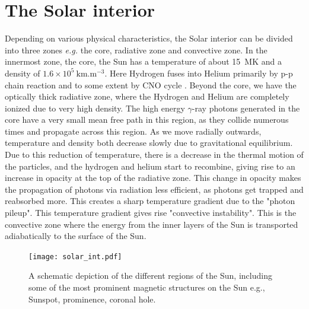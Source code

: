 \section{The Solar interior}\label{solar_int} 
Depending on various physical characteristics, the Solar interior can be divided into three zones {\it e.g.} the core, radiative zone and convective zone. In the innermost zone, the core, the Sun has a temperature of about 15~MK and a density of $\mathrm{1.6\times 10^{5}~km.m^{-3}}$. Here Hydrogen fuses into Helium primarily by p-p chain reaction \citep{bethe38} and to some extent by CNO cycle \citep{bethe39}. Beyond the core, we have the optically thick radiative zone, where the Hydrogen and Helium are completely ionized due to very high density. The high energy $\gamma$-ray photons generated in the core have a very small mean free path in this region, as they collide numerous times and propagate across this region. As we move radially outwards, temperature and density both decrease slowly due to gravitational equilibrium. Due to this reduction of temperature, there is a decrease in the thermal motion of the particles, and the hydrogen and helium start to recombine, giving rise to an increase in opacity at the top of the radiative zone. This change in opacity makes the propagation of photons via radiation less efficient, as photons get trapped and reabsorbed more. This creates a sharp temperature gradient due to the "photon pileup". This temperature gradient gives rise "convective instability". This is the convective zone where the energy from the inner layers of the Sun is transported adiabatically to the surface of the Sun. 

\begin{figure}[ht!]
    \centering
    \texttt{[image: solar\_int.pdf]}
    \caption[A schematic depiction of the different regions of the Sun.]{A schematic depiction of the different regions of the Sun, including some of the most prominent magnetic structures on the Sun e.g., Sunspot, prominence, coronal hole.}
    \label{fig_solar_int}
\end{figure}

